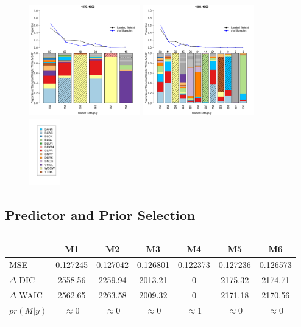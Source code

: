 \documentclass[12pt]{article}
\begin{document}
\begin{figure}[h!]
\centering
\includegraphics[width=0.43\textwidth]{./pictures/1978to1982Bar3.pdf}
\includegraphics[width=0.43\textwidth]{./pictures/1983to1990Bar3.pdf}
\includegraphics[width=0.12\textwidth]{./pictures/barplotLegend.pdf}
\caption{}
\label{bar7883}
\end{figure}



\subsection{Predictor and Prior
Selection}\label{predictor-and-prior-selection}

\begin{table}
\centering
\begin{tabular}[c]{@{}lcccccc@{}}
\hline
& M1 & M2 & M3 & M4 & M5 & M6 \\ \hline
MSE & 0.127245 & 0.127042 & 0.126801 & 0.122373 & 0.127236 & 0.126573 \\ %
\(\Delta\) DIC & 2558.56 & 2259.94 & 2013.21 & 0 & 2175.32 & 2174.71 \\ %
\(\Delta\) WAIC & 2562.65 & 2263.58 & 2009.32 & 0 & 2171.18 & 2170.56 \\ %
\(pr(M|y)\) & \(\approx0\) & \(\approx0\) & \(\approx0\) & \(\approx1\) & \(\approx0\) & \(\approx0\) \\ \hline
\label{priorTab}
\end{tabular}
\caption{}
\end{table}
\end{document}

